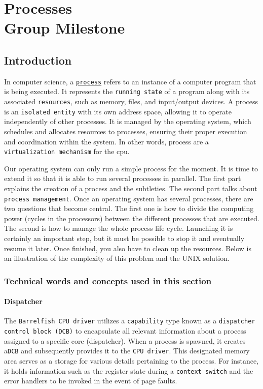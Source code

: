 \chapter[Processes]{Processes \\ \Large \textnormal{Group Milestone}}

\section{Introduction}

In computer science, a \href{https://en.wikipedia.org/wiki/Process_(computing)}{\texttt{process}} refers to an instance of a computer program that is being executed. It represents the \texttt{running state} of a program along with its associated \texttt{resources}, such as memory, files, and input/output devices. A process is an \texttt{isolated entity} with its own address space, allowing it to operate independently of other processes. It is managed by the operating system, which schedules and allocates resources to processes, ensuring their proper execution and coordination within the system. In other words, process are a \texttt{virtualization mechanism} for the cpu.

Our operating system can only run a simple process for the moment. It is time to extend it so that it is able to run several processes in parallel. The first part explains the creation of a process and the subtleties. The second part talks about \texttt{process management}. Once an operating system has several processes, there are two questions that become central. The first one is how to divide the computing power (cycles in the processors) between the different processes that are executed. The second is how to manage the whole process life cycle. Launching it is certainly an important step, but it must be possible to stop it and eventually resume it later. Once finished, you also have to clean up the resources. Below is an illustration of the complexity of this problem and the UNIX solution. 

\subsection{Technical words and concepts used in this section}

\subsubsection{Dispatcher}

The \texttt{Barrelfish CPU driver} utilizes a \texttt{capability} type known as a \texttt{dispatcher control block (DCB)} to encapsulate all relevant information about a process assigned to a specific core (dispatcher). When a process is spawned, it creates a\texttt{DCB} and subsequently provides it to the \texttt{CPU driver}. This designated memory area serves as a storage for various details pertaining to the process. For instance, it holds information such as the register state during a \texttt{context switch} and the error handlers to be invoked in the event of page faults.

